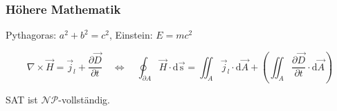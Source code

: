 \begin{frame}
\frametitle{Höhere Mathematik}

Pythagoras: \(a^2 + b^2 = c^2\), Einstein: \(E = mc^2\)

\[\nabla \times \vec{H} = \vec{j}_l + \dfrac{\partial\vec{D}}{\partial t} \quad\Longleftrightarrow\quad
\oint_{\partial A} \vec{H} \cdot \mathrm{d\vec{s}} = \iint_{A} \vec{j}_l \cdot \mathrm{d}\vec{A} +
\left(\iint_{A} \dfrac{\partial\vec{D}}{\partial t} \cdot \mathrm{d}\vec{A}\right)\]

\begin{Satz}[Cook, 1971]
\centering SAT ist \(\mathcal{NP}\)-vollständig.
\end{Satz}
\end{frame}
